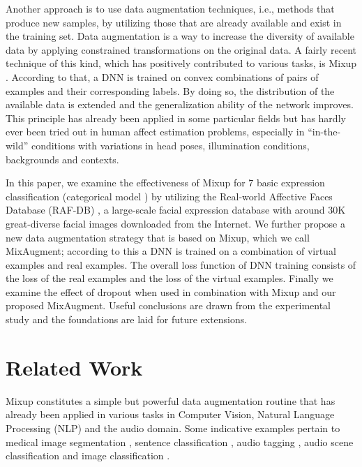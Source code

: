\documentclass[10pt,twocolumn,letterpaper]{article}
\begin{document}
Another approach is to use data augmentation techniques, i.e., methods that produce new samples, by utilizing those that are already available and exist in the training set. Data augmentation is a way to increase the diversity of available data by applying constrained transformations on the original data.
A fairly recent technique of this kind, which has positively contributed to various tasks, is Mixup \cite{zhang2017mixup}. According to that, a DNN is trained on convex combinations of pairs of examples and their corresponding labels. By doing so, the distribution of the available data is extended and the generalization ability of the network improves. This principle has already been applied in some particular fields but has hardly ever been tried out in human affect estimation problems, especially in \enquote{in-the-wild} conditions with variations in head poses, illumination conditions, backgrounds and contexts.

In this paper, we examine the effectiveness of Mixup for 7 basic expression classification (categorical model \cite{ekman2002facial}) by utilizing the Real-world Affective Faces Database (RAF-DB) \cite{li2017reliable}, a large-scale facial expression database with around 30K great-diverse facial images downloaded from the Internet. We further  propose a new data augmentation strategy that is
based on Mixup, which we call MixAugment; according to this a DNN is trained  on a combination of virtual examples and real examples. The overall loss function of DNN training consists of the loss of the real examples and the loss of the virtual examples. Finally we examine the effect of dropout \cite{srivastava2014dropout} when used in combination with Mixup and our proposed MixAugment. Useful conclusions are drawn from the experimental study and the foundations are laid for future extensions.

\section{Related Work}

Mixup \cite{zhang2017mixup} constitutes a simple but powerful data augmentation routine that has already been applied in various tasks in Computer Vision, Natural Language Processing (NLP) and the audio domain. Some indicative examples pertain to medical image segmentation \cite{eaton2018improving}, sentence classification \cite{guo2019augmenting,chen2020mixtext,sun2020mixup}, audio tagging \cite{wei2018sample}, audio scene classification \cite{xu2018mixup} and image classification \cite{kollias2021mia,Tailor,kollias2020transparent,kollias2018deep1,hou2021cmc}.
\end{document}
